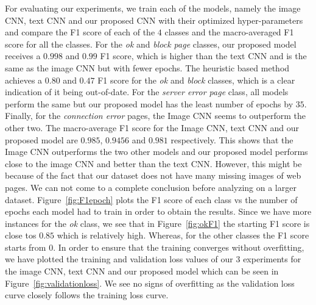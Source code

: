 \documentclass{article} %
\begin{document}
For evaluating our experiments, we train each of the models, namely the image CNN, text CNN and our proposed CNN with their optimized hyper-parameters and compare the F1 score of each of the $4$ classes and the macro-averaged F1 score for all the classes. For the \textit{ok} and \textit{block page} classes, our proposed model receives a $0.998$ and $0.99$ F1 score, which is higher than the text CNN and is the same as the image CNN but with fewer epochs. The heuristic based method achieves a $0.80$ and $0.47$ F1 score for the \textit{ok} and \textit{block} classes, which is a clear indication of it being out-of-date. For the \textit{server error page} class, all models perform the same but our proposed model has the least number of epochs by $35$. Finally, for the \textit{connection error} pages, the Image CNN seems to outperform the other two. The macro-average F1 score for the Image CNN, text CNN and our proposed model are $0.985$, $0.9456$ and $0.981$ respectively. This shows that the Image CNN outperforms the two other models and our proposed model performs close to the image CNN and better than the text CNN. However, this might be because of the fact that our dataset does not have many missing images of web pages. We can not come to a complete conclusion before analyzing on a larger dataset.
Figure~\ref{fig:F1epoch} plots the F1 score of each class vs the number of epochs each model had to train in order to obtain the results. Since we have more instances for the \textit{ok} class, we see that in Figure~\ref{fig:okF1} the starting F1 score is close tos $0.85$ which is relatively high. Whereas, for the other classes the F1 score starts from $0$.
In order to ensure that the training converges without overfitting, we have plotted the training and validation loss values of our $3$ experiments for the image CNN, text CNN and our proposed model which can be seen in Figure~\ref{fig:validationloss}. We see no signs of overfitting as the validation loss curve closely follows the training loss curve.
\end{document}
